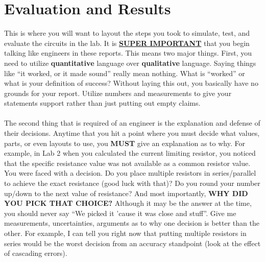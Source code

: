 \documentclass{hitec}
\begin{document}
\section{Evaluation and Results}
This is where you will want to layout the steps you took to simulate, test, and evaluate the circuits in the lab. It is \textbf{\underline{SUPER IMPORTANT}} that you begin talking like engineers in these reports. This means two major things. First, you need to utilize \textbf{quantitative} language over \textbf{qualitative} language. Saying things like ``it worked, or it made sound'' really mean nothing. What is ``worked'' or what is your definition of success? Without laying this out, you basically have no grounds for your report. Utilize numbers and measurements to give your statements support rather than just putting out empty claims.
\\
\\
\noindent
The second thing that is required of an engineer is the explanation and defense of their decisions. Anytime that you hit a point where you must decide what values, parts, or even layouts to use, you \textbf{MUST} give an explanation as to why. For example, in Lab 2 when you calculated the current limiting resistor, you noticed that the specific resistance value was not available as a common resistor value. You were faced with a decision. Do you place multiple resistors in series/parallel to achieve the exact resistance (good luck with that)? Do you round your number up/down to the next value of resistance? And most importantly, \textbf{WHY DID YOU PICK THAT CHOICE?} Although it may be the answer at the time, you should never say ``We picked it 'cause it was close and stuff''. Give me measurements, uncertainties, arguments as to why one decision is better than the other. For example, I can tell you right now that putting multiple resistors in series would be the worst decision from an accuracy standpoint (look at the effect of cascading errors).
\end{document}
